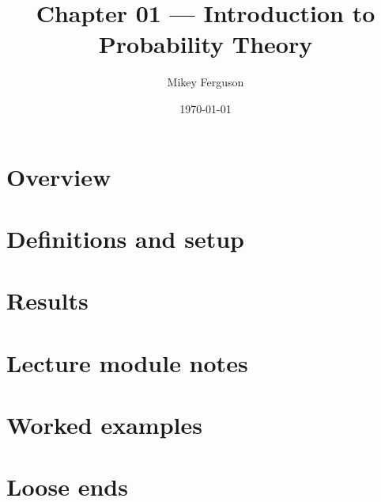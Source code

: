 \documentclass[11pt]{article}
\title{Chapter 01 --- Introduction to Probability Theory}
\author{Mikey Ferguson}
\date{\today}
\begin{document}
\maketitle
\tableofcontents
\bigskip

\section{Overview}

\section{Definitions and setup}

\section{Results}

\section{Lecture module notes}

\section{Worked examples}

\section{Loose ends}
\end{document}
